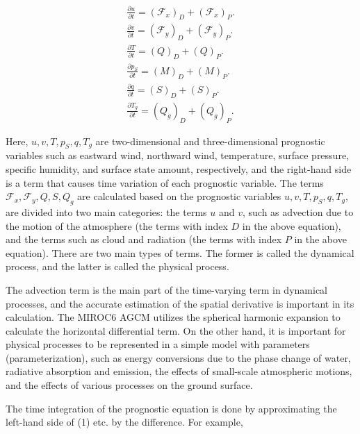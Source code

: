 \begin{eqnarray}
  \frac{\partial{u}}{\partial {t}}  =  \left( {\mathcal F}_x \right)_D + \left( {\mathcal F}_x \right)_P.
   \\
  \frac{\partial{v}}{\partial {t}}  =  \left( {\mathcal F}_y \right)_D + \left( {\mathcal F}_y \right)_P. \\
  \frac{\partial{T}}{\partial {t}}  =  \left( Q \right)_D + \left( Q \right)_P. \\
  \frac{\partial{p_S}}{\partial {t}}  =  \left( M \right)_D + \left( M \right)_P. \\
  \frac{\partial{q}}{\partial {t}}  =  \left( S \right)_D + \left( S \right)_P. \\
  \frac{\partial{T_g}}{\partial {t}}  =  \left( Q_g \right)_D + \left( Q_g \right)_P.
\end{eqnarray}

Here, \(u,v,T,p_S,q,T_g\) are two-dimensional and three-dimensional
prognostic variables such as eastward wind, northward wind, temperature,
surface pressure, specific humidity, and surface state amount,
respectively, and the right-hand side is a term that causes time
variation of each prognostic variable. The terms
\({\mathcal F}_x,{\mathcal F}_y,Q,S,Q_g\) are calculated based on the
prognostic variables \(u,v,T,p_S,q,T_g\), are divided into two main
categories: the terms \(u\) and \(v\), such as advection due to the
motion of the atmosphere (the terms with index \(D\) in the above
equation), and the terms such as cloud and radiation (the terms with
index \(P\) in the above equation). There are two main types of terms.
The former is called the dynamical process, and the latter is called the
physical process.

The advection term is the main part of the time-varying term in
dynamical processes, and the accurate estimation of the spatial
derivative is important in its calculation. The MIROC6 AGCM utilizes the
spherical harmonic expansion to calculate the horizontal differential
term. On the other hand, it is important for physical processes to be
represented in a simple model with parameters (parameterization), such
as energy conversions due to the phase change of water, radiative
absorption and emission, the effects of small-scale atmospheric motions,
and the effects of various processes on the ground surface.

The time integration of the prognostic equation is done by approximating
the left-hand side of (1) etc. by the difference. For example,

